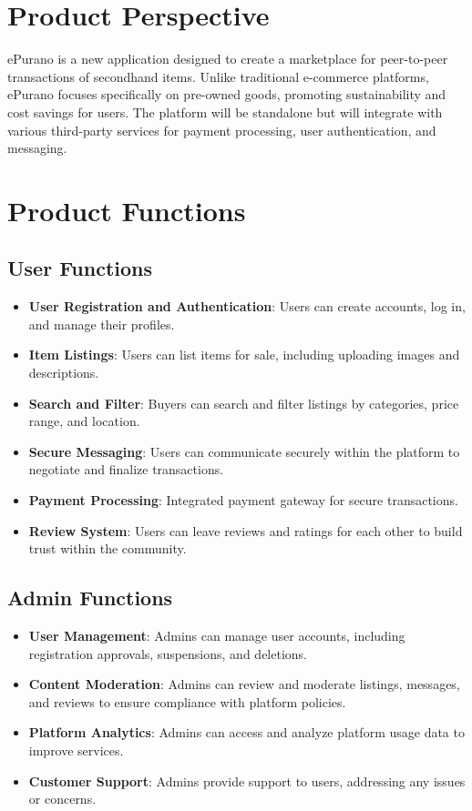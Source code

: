 
\section{Product Perspective}

ePurano is a new application designed to create a marketplace for peer-to-peer transactions of secondhand items. Unlike traditional e-commerce platforms, ePurano focuses specifically on pre-owned goods, promoting sustainability and cost savings for users. The platform will be standalone but will integrate with various third-party services for payment processing, user authentication, and messaging.

\section{Product Functions}

\subsection{User Functions}

\begin{itemize}
    \item \textbf{User Registration and Authentication}: Users can create accounts, log in, and manage their profiles.
    \item \textbf{Item Listings}: Users can list items for sale, including uploading images and descriptions.
    \item \textbf{Search and Filter}: Buyers can search and filter listings by categories, price range, and location.
    \item \textbf{Secure Messaging}: Users can communicate securely within the platform to negotiate and finalize transactions.
    \item \textbf{Payment Processing}: Integrated payment gateway for secure transactions.
    \item \textbf{Review System}: Users can leave reviews and ratings for each other to build trust within the community.
\end{itemize}

\subsection{Admin Functions}

\begin{itemize}
    \item \textbf{User Management}: Admins can manage user accounts, including registration approvals, suspensions, and deletions.
    \item \textbf{Content Moderation}: Admins can review and moderate listings, messages, and reviews to ensure compliance with platform policies.
    \item \textbf{Platform Analytics}: Admins can access and analyze platform usage data to improve services.
    \item \textbf{Customer Support}: Admins provide support to users, addressing any issues or concerns.
\end{itemize}

